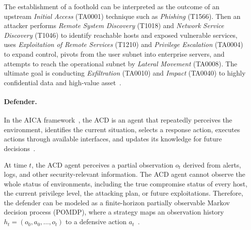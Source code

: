 \documentclass[sigconf,review,anonymous]{acmart}
\begin{document}
The establishment of a foothold can be interpreted as the outcome of an upstream \emph{Initial Access} (TA0001) technique such as \emph{Phishing} (T1566).
Then an attacker performs \emph{Remote System Discovery} (T1018) and \emph{Network Service Discovery} (T1046) to identify reachable hosts and exposed vulnerable services, uses \emph{Exploitation of Remote Services} (T1210) and \emph{Privilege Escalation} (TA0004) to expand control, pivots from the user subnet into enterprise servers, and attempts to reach the operational subnet by \emph{Lateral Movement} (TA0008).
The ultimate goal is conducting \emph{Exfiltration} (TA0010) and \emph{Impact} (TA0040) to highly confidential data and high-value asset~\cite{mitre_attack_enterprise}.

\paragraph{Defender.}
In the AICA framework~\cite{kott2023aica}, the ACD is an agent that repeatedly perceives the environment, identifies the current situation, selects a response action, executes actions through available interfaces, and updates its knowledge for future decisions~\cite{kott2023aica}. 

At time \(t\), the ACD agent perceives a partial observation \(o_t\) derived from alerts, logs, and other security-relevant information. 
The ACD agent cannot observe the whole status of environments, including the true compromise status of every host, the current privilege level, the attacking plan, or future exploitations. 
Therefore, the defender can be modeled as a finite-horizon partially observable Markov decision process (POMDP), where a strategy maps an observation history \(h_t=(o_0,a_0,\ldots,o_t)\) to a defensive action \(a_t\)~\cite{standen2021cyborg,kiely2023cage2}. 
\end{document}
